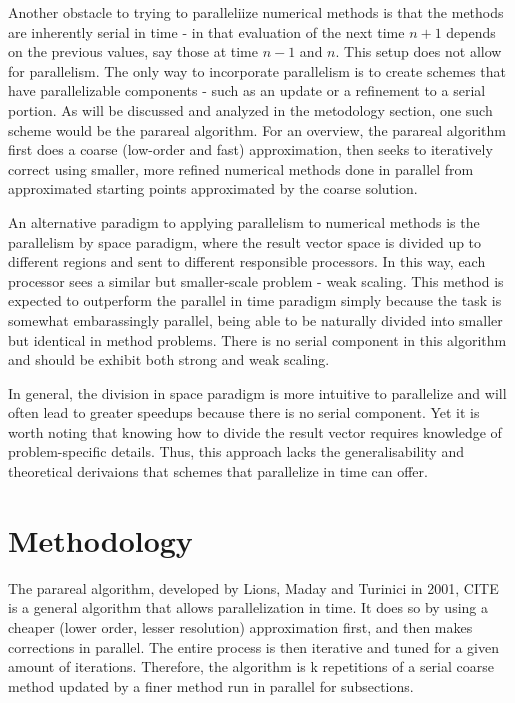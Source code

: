 \documentclass[letterpaper,twocolumn,11pt]{article}
\begin{document}
Another obstacle to trying to paralleliize numerical methods is that the methods are inherently serial in time - in that evaluation of the next time $n+1$ depends on the previous values, say those at time $n-1$ and $n$.  This setup does not allow for parallelism.  The only way to incorporate parallelism is to create schemes that have parallelizable components - such as an update or a refinement to a serial portion.  As will be discussed and analyzed in the metodology section, one such scheme would be the parareal algorithm.  For an overview, the parareal algorithm first does a coarse (low-order and fast) approximation, then seeks to iteratively correct using smaller, more refined numerical methods done in parallel from approximated starting points approximated by the coarse solution.

An alternative paradigm to applying parallelism to numerical methods is the parallelism by space paradigm, where the result vector space is divided up to different regions and sent to different responsible processors.  In this way, each processor sees a similar but smaller-scale problem - weak scaling.  This method is expected to outperform the parallel in time paradigm simply because the task is somewhat embarassingly parallel, being able to be naturally divided into smaller but identical in method problems.  There is no serial component in this algorithm and should be exhibit both strong and weak scaling.

In general, the division in space paradigm is more intuitive to parallelize and will often lead to greater speedups because there is no serial component.  Yet it is worth noting that knowing how to divide the result vector requires knowledge of problem-specific details.  Thus, this approach lacks the generalisability and theoretical derivaions that schemes that parallelize in time can offer.

\section{Methodology}

The parareal algorithm, developed by Lions, Maday and Turinici in 2001, CITE is a general algorithm that allows parallelization in time.  It does so by using a cheaper (lower order, lesser resolution) approximation first, and then makes corrections in parallel.  The entire process is then iterative and tuned for a given amount of iterations.  Therefore, the algorithm is k repetitions of a serial coarse method updated by a finer method run in parallel for subsections.
\end{document}
